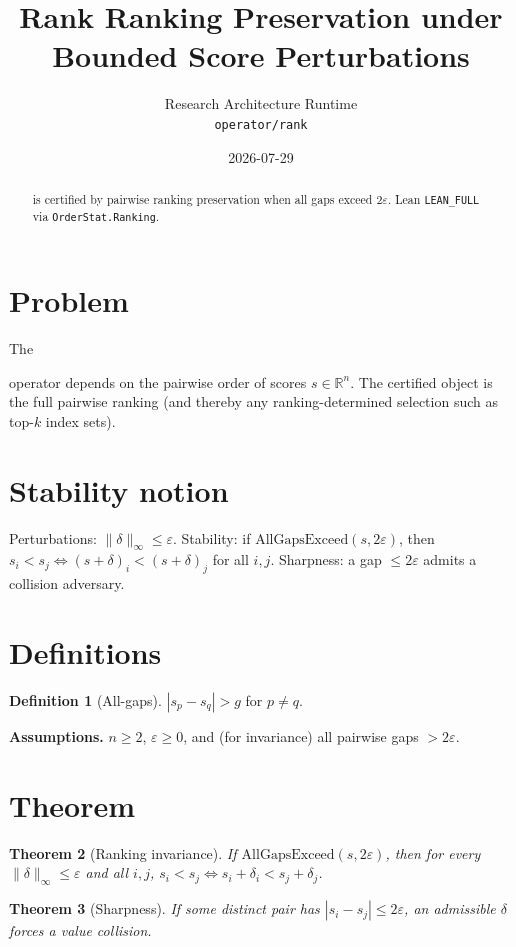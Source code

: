 \documentclass[12pt]{article}
\title{Rank Ranking Preservation under Bounded Score Perturbations}
\author{Research Architecture Runtime\\[0.25em]
{\normalsize\texttt{operator/rank}}}
\date{2026-07-29}
\theoremstyle{plain}
\newtheorem{theorem}{Theorem}
\theoremstyle{definition}
\newtheorem{definition}[theorem]{Definition}
\theoremstyle{remark}
\newcommand{\leanpath}[1]{%
  {\raggedright\urlstyle{tt}\path{#1}}}
\begin{document}
\maketitle

\begin{abstract}
\leanpath{rank} is certified by pairwise ranking preservation when all gaps exceed $2\varepsilon$. Lean \texttt{LEAN\_FULL} via \texttt{OrderStat.Ranking}.
\end{abstract}

\noindent
\begin{center}
\end{center}
\vspace{0.6em}

\section{Problem}
{\raggedright\sloppy
The \leanpath{rank} operator depends on the pairwise order of scores $s\in\mathbb{R}^n$. The certified object is the full pairwise ranking (and thereby any ranking-determined selection such as top-$k$ index sets).
\par}

\section{Stability notion}
Perturbations: $\|\delta\|_\infty\le\varepsilon$. Stability: if $\mathrm{AllGapsExceed}(s,2\varepsilon)$, then $s_i<s_j\Leftrightarrow (s+\delta)_i<(s+\delta)_j$ for all $i,j$. Sharpness: a gap $\le 2\varepsilon$ admits a collision adversary.

\section{Definitions}
\begin{definition}[All-gaps]
$|s_p-s_q|>g$ for $p\neq q$.\end{definition}
\noindent\textbf{Assumptions.} $n\ge 2$, $\varepsilon\ge 0$, and (for invariance) all pairwise gaps $>2\varepsilon$.

\section{Theorem}
\begin{theorem}[Ranking invariance]\label{thm:inv}
If $\mathrm{AllGapsExceed}(s,2\varepsilon)$, then for every $\|\delta\|_\infty\le\varepsilon$ and all $i,j$, $s_i<s_j\Leftrightarrow s_i+\delta_i<s_j+\delta_j$.
\end{theorem}
\begin{theorem}[Sharpness]\label{thm:sharp}
If some distinct pair has $|s_i-s_j|\le 2\varepsilon$, an admissible $\delta$ forces a value collision.
\end{theorem}
\end{document}
